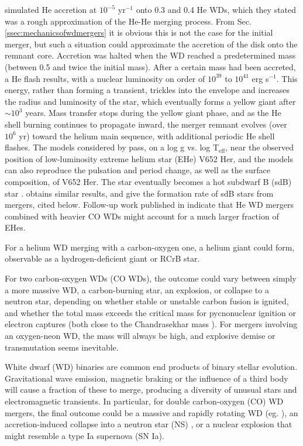 \cite{saioj00} simulated He accretion at $10^{-5}$ {\Msun} yr$^{-1}$ onto 0.3 and 0.4 {\Msun} He WDs, which they stated was a rough approximation of the He-He merging process.  From Sec. \ref{ssec:mechanicsofwdmergers} it is obvious this is not the case for the initial merger, but such a situation could approximate the accretion of the disk onto the remnant core.  Accretion was halted when the WD reached a predetermined mass (between 0.5 {\Msun} and twice the initial mass).  After a certain mass had been accreted, a He flash results, with a nuclear luminosity on order of $10^{39}$ to $10^{41}$ erg s$^{-1}$.  This energy, rather than forming a transient, trickles into the envelope and increases the radius and luminosity of the star, which eventually forms a yellow giant after $\sim 10^3$ years.  Mass transfer stops during the yellow giant phase, and as the He shell burning continues to propagate inward, the merger remnant evolves (over $10^6$ yr) toward the helium main sequence, with additional periodic He shell flashes.  The models considered by \citeauthor{saioj00} pass, on a log g vs. log T$_{\mathrm{eff}}$, near the observed position of low-luminosity extreme helium star (EHe) V652 Her, and the models can also reproduce the pulsation and period change, as well as the surface composition, of V652 Her.  The star eventually becomes a hot subdwarf B (sdB) star \citep{saioj00}.  \cite{han+02} obtains similar results, and \cite{han+03} give the formation rate of sdB stars from mergers, cited below.  Follow-up work published in \cite{saioj02} indicate that He WD mergers combined with heavier CO WDs might account for a much larger fraction of EHes.





For a helium WD merging with a carbon-oxygen one, a helium giant could form, observable as a hydrogen-deficient giant or RCrB star.  

For two carbon-oxygen WDs (CO WDs), the outcome could vary between simply a more massive WD, a carbon-burning star, an explosion, or collapse to a neutron star, depending on whether stable or unstable carbon fusion is ignited, and whether the total mass exceeds the critical mass for pycnonuclear ignition or electron captures (both close to the Chandrasekhar mass \Mch).  For mergers involving an oxygen-neon WD, the mass will always be high, and explosive demise or transmutation seems inevitable.

White dwarf (WD) binaries are common end products of binary stellar evolution.  Gravitational wave emission, magnetic braking or the influence of a third body will cause a fraction of these to merge, producing a diversity of unusual stars and electromagnetic transients.  In particular, for double carbon-oxygen (CO) WD mergers, the final outcome could be a massive and rapidly rotating WD (eg. \citealt{segrcm97}), an accretion-induced collapse into a neutron star (NS) \citep{saion85}, or a nuclear explosion that might resemble a type Ia supernova (SN Ia).

